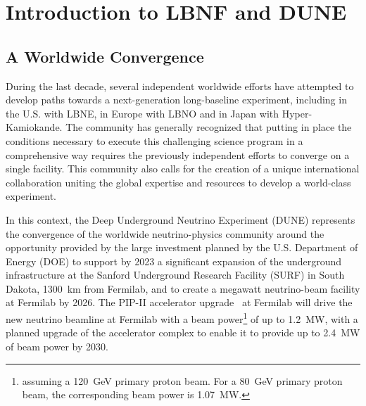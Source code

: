 

\chapter{Introduction to LBNF and DUNE}
\label{ch:project-overview}

%
%
\section{A Worldwide Convergence}

During the last decade, several independent worldwide efforts have attempted to develop paths towards a next-generation long-baseline experiment, including in the U.S. with LBNE, in Europe with LBNO and in Japan with Hyper-Kamiokande. The community has %
generally recognized that putting in place %
the conditions necessary to 
execute this challenging science program in a comprehensive way requires the previously independent 
efforts to converge on a single facility. This community %
also calls for the creation of a unique international collaboration uniting %
the global expertise and resources to develop a world-class experiment.

In this context, the Deep Underground Neutrino Experiment (DUNE) represents the convergence of the worldwide neutrino-physics community around the opportunity provided by the 
large investment planned by the U.S. Department of Energy (DOE) to support by 2023 a significant expansion of the underground infrastructure at the Sanford Underground Research 
Facility (SURF) in South Dakota, \SI{1300}{\km} from Fermilab, and to create a megawatt neutrino-beam facility at Fermilab by 2026.  The PIP-II accelerator upgrade~\cite{pip2-2013} at 
Fermilab will drive the new neutrino beamline at Fermilab with a beam power\footnote{assuming a \SI{120}{\GeV} primary proton beam. For a \SI{80}{\GeV} primary proton beam, the corresponding beam power is \SI{1.07}{\MW}.} of up to \SI{1.2}{\MW}, with a planned upgrade 
of the accelerator complex to enable it to provide up to \SI{2.4}{\MW} of beam power by 2030.  

